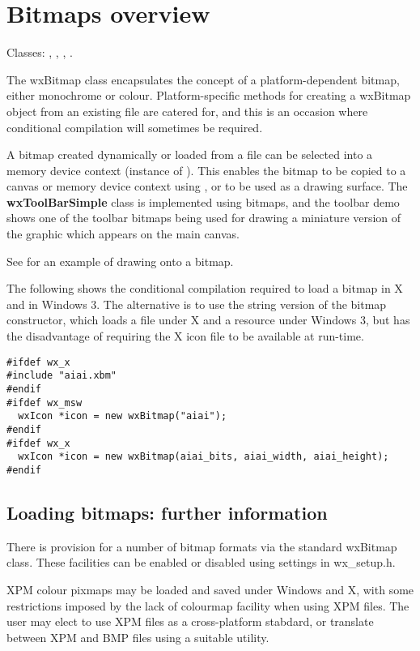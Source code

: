 \section{Bitmaps overview}\label{wxbitmapoverview}

Classes: , , , .

The wxBitmap class encapsulates the concept of a platform-dependent bitmap,
either monochrome or colour. Platform-specific methods for creating a
wxBitmap object from an existing file are catered for, and
this is an occasion where conditional compilation will sometimes be
required.

A bitmap created dynamically or loaded from a file can be selected
into a memory device context (instance of ). This
enables the bitmap to be copied to a canvas or memory device context
using , or to be used as a drawing surface.  The {\bf
wxToolBarSimple} class is implemented using bitmaps, and the toolbar demo
shows one of the toolbar bitmaps being used for drawing a miniature
version of the graphic which appears on the main canvas.

See  for an example of drawing onto a bitmap.

The following shows the conditional compilation required to load a
bitmap in X and in Windows 3. The alternative is to use the string
version of the bitmap constructor, which loads a file under X and a
resource under Windows 3, but has the disadvantage of requiring the
X icon file to be available at run-time.

\begin{verbatim}
#ifdef wx_x
#include "aiai.xbm"
#endif
#ifdef wx_msw
  wxIcon *icon = new wxBitmap("aiai");
#endif
#ifdef wx_x
  wxIcon *icon = new wxBitmap(aiai_bits, aiai_width, aiai_height);
#endif
\end{verbatim}

\subsection{Loading bitmaps: further information}

There is provision for a number of bitmap
formats via the standard wxBitmap class. These facilities can
be enabled or disabled using settings in wx\_setup.h.

XPM colour pixmaps may be loaded and saved under Windows and X, with
some restrictions imposed by the lack of colourmap facility when
using XPM files. The user may elect to use XPM files as a cross-platform
stabdard, or translate between XPM and BMP files using a suitable
utility.

